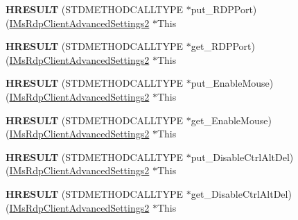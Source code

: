 \begin{DoxyCompactItemize}
{\bfseries H\+R\+E\+S\+U\+LT} (S\+T\+D\+M\+E\+T\+H\+O\+D\+C\+A\+L\+L\+T\+Y\+PE $\ast$put\+\_\+\+R\+D\+P\+Port)(\hyperlink{interface_m_s_t_s_c_lib_1_1_i_ms_rdp_client_advanced_settings2}{I\+Ms\+Rdp\+Client\+Advanced\+Settings2} $\ast$This
\item 
\mbox{\label{struct_m_s_t_s_c_lib_1_1_i_ms_rdp_client_advanced_settings2_vtbl_a10c9c2e51db7a92235b321ddc2336b82}} 
{\bfseries H\+R\+E\+S\+U\+LT} (S\+T\+D\+M\+E\+T\+H\+O\+D\+C\+A\+L\+L\+T\+Y\+PE $\ast$get\+\_\+\+R\+D\+P\+Port)(\hyperlink{interface_m_s_t_s_c_lib_1_1_i_ms_rdp_client_advanced_settings2}{I\+Ms\+Rdp\+Client\+Advanced\+Settings2} $\ast$This
\item 
\mbox{\label{struct_m_s_t_s_c_lib_1_1_i_ms_rdp_client_advanced_settings2_vtbl_a778251ea2db0c2740892d0a03465943e}} 
{\bfseries H\+R\+E\+S\+U\+LT} (S\+T\+D\+M\+E\+T\+H\+O\+D\+C\+A\+L\+L\+T\+Y\+PE $\ast$put\+\_\+\+Enable\+Mouse)(\hyperlink{interface_m_s_t_s_c_lib_1_1_i_ms_rdp_client_advanced_settings2}{I\+Ms\+Rdp\+Client\+Advanced\+Settings2} $\ast$This
\item 
\mbox{\label{struct_m_s_t_s_c_lib_1_1_i_ms_rdp_client_advanced_settings2_vtbl_a86cd3dcdd87deea6e29550ed397d48b2}} 
{\bfseries H\+R\+E\+S\+U\+LT} (S\+T\+D\+M\+E\+T\+H\+O\+D\+C\+A\+L\+L\+T\+Y\+PE $\ast$get\+\_\+\+Enable\+Mouse)(\hyperlink{interface_m_s_t_s_c_lib_1_1_i_ms_rdp_client_advanced_settings2}{I\+Ms\+Rdp\+Client\+Advanced\+Settings2} $\ast$This
\item 
\mbox{\label{struct_m_s_t_s_c_lib_1_1_i_ms_rdp_client_advanced_settings2_vtbl_a66fa96fbd68fedff05ad1ec378116369}} 
{\bfseries H\+R\+E\+S\+U\+LT} (S\+T\+D\+M\+E\+T\+H\+O\+D\+C\+A\+L\+L\+T\+Y\+PE $\ast$put\+\_\+\+Disable\+Ctrl\+Alt\+Del)(\hyperlink{interface_m_s_t_s_c_lib_1_1_i_ms_rdp_client_advanced_settings2}{I\+Ms\+Rdp\+Client\+Advanced\+Settings2} $\ast$This
\item 
\mbox{\label{struct_m_s_t_s_c_lib_1_1_i_ms_rdp_client_advanced_settings2_vtbl_ae70240368a966d45a388bfa8dda95207}} 
{\bfseries H\+R\+E\+S\+U\+LT} (S\+T\+D\+M\+E\+T\+H\+O\+D\+C\+A\+L\+L\+T\+Y\+PE $\ast$get\+\_\+\+Disable\+Ctrl\+Alt\+Del)(\hyperlink{interface_m_s_t_s_c_lib_1_1_i_ms_rdp_client_advanced_settings2}{I\+Ms\+Rdp\+Client\+Advanced\+Settings2} $\ast$This

\end{DoxyCompactItemize}
